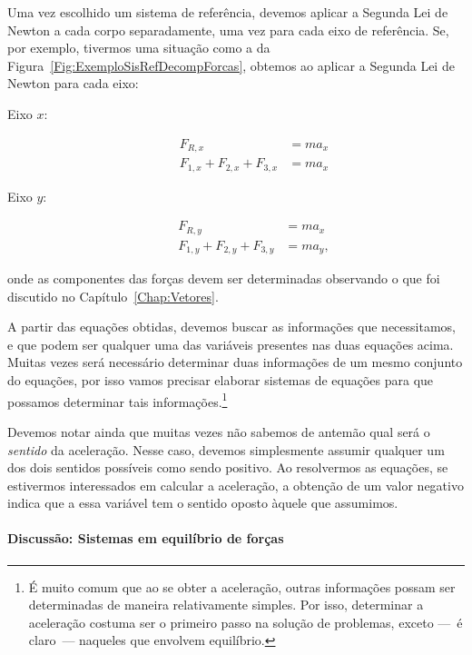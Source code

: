 Uma vez escolhido um sistema de referência, devemos aplicar a Segunda Lei de Newton a cada corpo separadamente, uma vez para cada eixo de referência. Se, por exemplo, tivermos uma situação como a da Figura~\ref{Fig:ExemploSisRefDecompForcas}, obtemos ao aplicar a Segunda Lei de Newton para cada eixo:
\begin{description}
    \item[Eixo $x$:]
        \begin{align}
            F_{R, x} &= ma_x \\
            F_{1, x} + F_{2, x} + F_{3, x} &= m a_x
        \end{align}
    \item[Eixo $y$:]
        \begin{align}
            F_{R, y} &= ma_x \\
            F_{1, y} + F_{2, y} + F_{3, y} &= m a_y,
        \end{align}            
\end{description}
%
onde as componentes das forças devem ser determinadas observando o que foi discutido no Capítulo~\ref{Chap:Vetores}.

A partir das equações obtidas, devemos buscar as informações que necessitamos, e que podem ser qualquer uma das variáveis presentes nas duas equações acima. Muitas vezes será necessário determinar duas informações de um mesmo conjunto do equações, por isso vamos precisar elaborar sistemas de equações para que possamos determinar tais informações.\footnote{É muito comum que ao se obter a aceleração, outras informações possam ser determinadas de maneira relativamente simples. Por isso, determinar a aceleração costuma ser o primeiro passo na solução de problemas, exceto ---~é claro~--- naqueles que envolvem equilíbrio.}

Devemos notar ainda que muitas vezes não sabemos de antemão qual será o \emph{sentido} da aceleração. Nesse caso, devemos simplesmente assumir qualquer um dos dois sentidos possíveis como sendo positivo. Ao resolvermos as equações, se estivermos interessados em calcular a aceleração, a obtenção de um valor negativo indica que a essa variável tem o sentido oposto àquele que assumimos.


\paragraph{Discussão: Sistemas em equilíbrio de forças}


